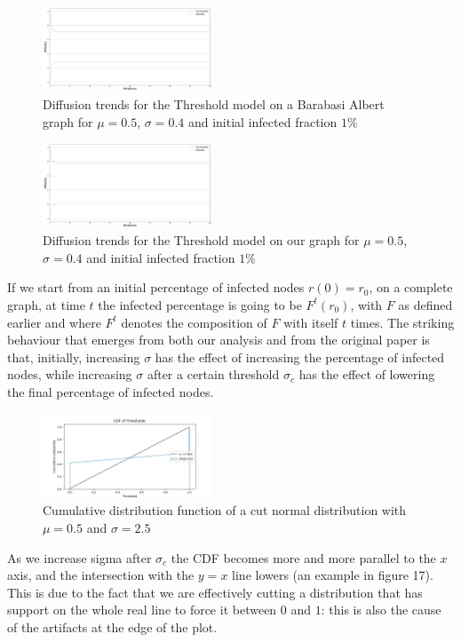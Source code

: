 \documentclass[sigchi]{acmart}
\begin{document}
\begin{figure}[!htbp]
    \centering
    \includegraphics[width=0.45\textwidth]{img/Threshold/diffusionBAThreshold_fraction=0.01_mu0.5_sigma=0.4.png}
    \caption{Diffusion trends for the Threshold model on a Barabasi Albert graph for $\mu = 0.5$, $\sigma = 0.4$ and initial infected fraction $1\%$}
    \label{fig:my_label}
\end{figure}
\begin{figure}[!htbp]
    \centering
    \includegraphics[width=0.45\textwidth]{img/Threshold/diffusionOurThreshold_fraction=0.01_mu0.5_sigma=0.4.png}
    \caption{Diffusion trends for the Threshold model on our graph for $\mu = 0.5$, $\sigma = 0.4$ and initial infected fraction $1\%$}
    \label{fig:my_label}
\end{figure}
If we start from an initial percentage of infected nodes $r(0) = r_0$, on a complete graph, at time $t$ the infected percentage is going to be $F^t(r_0)$, with $F$ as defined earlier and where $F^t$ denotes the composition of $F$ with itself $t$ times. The striking behaviour that emerges from both our analysis and from the original paper is that, initially, increasing $\sigma$ has the effect of increasing the percentage of infected nodes, while increasing $\sigma$ after a certain threshold $\sigma_c$ has the effect of lowering the final percentage of infected nodes.
\begin{figure}[!htbp]
    \centering
    \includegraphics[width=0.45\textwidth]{img/Threshold/demonstrationParallel.png}
    \caption{Cumulative distribution function of a cut normal distribution with $\mu = 0.5$ and $\sigma = 2.5$}
    \label{fig:my_label}
\end{figure}
As we increase sigma after $\sigma_c$ the CDF becomes more and more parallel to the $x$ axis, and the intersection with the $y = x$ line lowers (an example in figure 17). This is due to the fact that we are effectively cutting a distribution that has support on the whole real line to force it between $0$ and $1$: this is also the cause of the artifacts at the edge of the plot.
\end{document}
